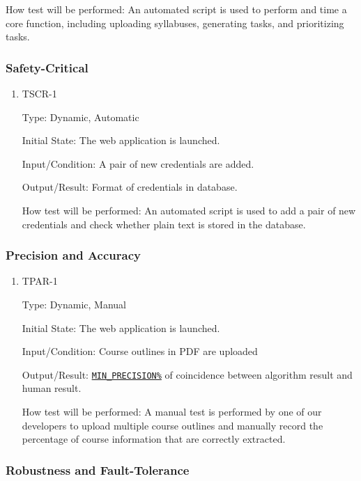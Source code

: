 \documentclass[12pt, titlepage]{article}
\begin{document}
\begin{enumerate}
\begin{enumerate}
How test will be performed: An automated script is used to perform and time a core function, including uploading syllabuses, generating tasks, and prioritizing tasks.

\end{enumerate}
\subsubsection{Safety-Critical}

\begin{enumerate}
\item{TSCR-1\\}\label{TSCR-1}

Type: Dynamic, Automatic
					
Initial State: The web application is launched.
					
Input/Condition: A pair of new credentials are added.
					
Output/Result: Format of credentials in database.
					
How test will be performed: An automated script is used to add a pair of new credentials and check whether plain text is stored in the database.

\end{enumerate}
\subsubsection{Precision and Accuracy}

\begin{enumerate}
\item{TPAR-1\\}\label{TPAR-1}

Type: Dynamic, Manual
					
Initial State: The web application is launched.
					
Input/Condition:  Course outlines in PDF are uploaded
					
Output/Result: \hyperref[MIN_PRECISION]{\texttt{MIN\_PRECISION\%}} of coincidence between algorithm result and human result.
					
How test will be performed: A manual test is performed by one of our developers to upload multiple course outlines and manually record the percentage of course information that are correctly extracted. 

\end{enumerate}

\subsubsection{Robustness and Fault-Tolerance}


\end{enumerate}
\end{document}
